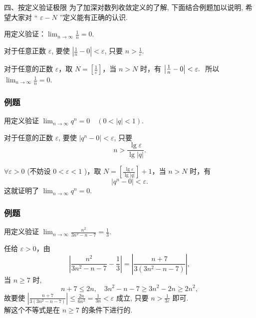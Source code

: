 \documentclass[mathserif]{beamer}
\begin{document}
\begin{frame}{ 四、按定义验证极限}%
	\suojin 为了加深对数列收敛定义的了解, 下面结合例题加以说明, 希望大家对 “ $\varepsilon-N$ ”定义能有正确的认识. 
	\begin{ex}
		\suojin 用定义验证：$\lim _{n \rightarrow \infty} \frac{1}{n}=0$.
	\end{ex}
	 对于任意正数 $\varepsilon$, 要使 $\left|\frac{1}{n}-0\right|<\varepsilon$, 只要 $n>\frac{1}{\varepsilon}$.\pause
	\begin{proofs}
		\suojin 对于任意的正数 $\varepsilon$，取 $N=\left[\frac{1}{\varepsilon}\right]$，当 $n>N$ 时，有 $\left|\frac{1}{n}-0\right|<\varepsilon.\ \  $所以 $\lim _{n \rightarrow \infty} \frac{1}{n}=0$.  
	\end{proofs}
\end{frame}



\begin{frame}{}%
	\frametitle{例题}
	\begin{ex}
		\suojin 用定义验证 $\lim _{n \rightarrow \infty} q^n=0 \quad(0<|q|<1)$.
	\end{ex} 
	 对于任意的正数 $\varepsilon$, 要使 $\left|q^n-0\right|<\varepsilon$, 只要
	$$
	n>\frac{\lg \varepsilon}{\lg |q|} . 
	$$
	\pause
	\begin{proofs}
		\suojin $\forall \varepsilon>0$ (不妨设 $0<\varepsilon<1$ )，取 $N=\left[\frac{\lg \varepsilon}{\lg |q|}\right]+1$，当 $n>N$ 时，有
	$$
	\left|q^n-0\right|<\varepsilon.
	$$
	这就证明了 $\lim _{n \rightarrow \infty} q^n=0$.
	\end{proofs}
	
\end{frame}


\begin{frame}{}%
	\frametitle{例题}
	\begin{ex}
		\suojin 用定义验证 $\lim _{n \rightarrow \infty} \frac{n^2}{3 n^2-n-7}=\frac{1}{3}$.
	\end{ex} 
	 任给 $\varepsilon>0$，由
	$$
	\left|\frac{n^2}{3 n^2-n-7}-\frac{1}{3}\right|=\left|\frac{n+7}{3\left(3 n^2-n-7\right)}\right|,
	$$
	当 $n \geq 7$ 时, 
	$$n+7 \leq 2 n,\quad 3 n^2-n-7 \geqslant 3 n^2-2 n \geqslant 2 n^2,$$
	故要使 $\left|\frac{n+7}{3\left(3 n^2-n-7\right)}\right| \leq \frac{2 n}{6 n^2}=\frac{1}{3 n}<\varepsilon $ 成立, 只要 $n>\frac{1}{3 \varepsilon}$ 即可.  \\
	 解这个不等式是在 $n \geq 7$ 的条件下进行的. 
\end{frame}
\end{document}
